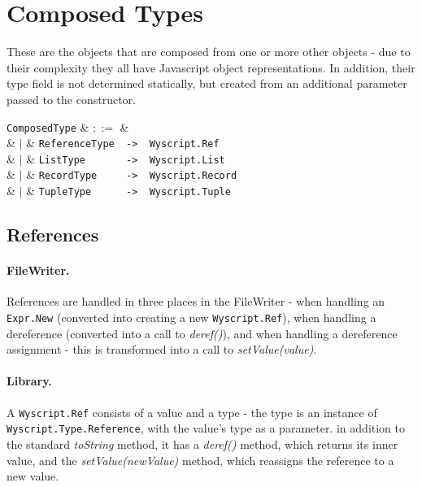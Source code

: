 
\section{Composed Types}
\label{c_types_composed_types}

These are the objects that are composed from one or more other objects - due to their complexity they all have Javascript object representations. In addition, their type field is not determined statically, but created from an additional parameter passed to the constructor.

\begin{syntax}
  \verb+ComposedType+ & $::=$ & \\
  & $|$ & \verb+ReferenceType  ->  Wyscript.Ref+\\
  & $|$ & \verb+ListType       ->  Wyscript.List+\\
  & $|$ & \verb+RecordType     ->  Wyscript.Record+\\
  & $|$ & \verb+TupleType      ->  Wyscript.Tuple+\\
\end{syntax}



\subsection{References}
\label{c_types_reference}

\paragraph{FileWriter.} References are handled in three places in the FileWriter - when handling an \lstinline{Expr.New} (converted into creating a new \lstinline{Wyscript.Ref}), when handling a dereference (converted into a call to {\em deref()}), and when handling a dereference assignment - this is transformed into a call to {\em setValue(value)}.

\paragraph{Library.} A \lstinline{Wyscript.Ref} consists of a value and a type - the type is an instance of \lstinline{Wyscript.Type.Reference}, with the value's type as a parameter. in addition to the standard {\em toString} method, it has a {\em deref()} method, which returns its inner value, and the {\em setValue(newValue)} method, which reassigns the reference to a new value.

